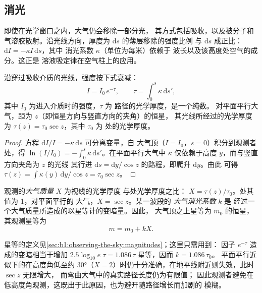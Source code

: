 \subsection*{消光}

即使在光学窗口之内，大气仍会移除一部分光，
其方式包括吸收，以及被分子和气溶胶散射。沿光线方向，厚度为
$\mathrm ds$ 的薄层移除的强度比例
与 $\mathrm ds$ 成正比：$\mathrm dI = -\kappa I\,\mathrm ds$，其中
消光系数 $\kappa$（单位为每米）依赖于
波长以及该高度处空气的成分。这正是
溶液吸定律在空气柱上的应用。

\begin{proposition}[布格定律]\label{prop:b1:observing-the-sky:bouguer}
沿穿过吸收介质的光线，强度按下式衰减：
\[
  I = I_0\,e^{-\tau}, \qquad \tau = \int_0^s \kappa\,\mathrm ds' ,
\]
其中 $I_0$ 为进入介质时的强度，$\tau$ 为
路径的光学厚度，是一个纯数。
对平面平行大气，距为 $z$（即恒星方向与竖直方向的夹角）的恒星，
其光线所经过的光学厚度为
$\tau(z) = \tau_0\sec z$，其中 $\tau_0$ 为
处的光学厚度。
\end{proposition}

\begin{proof}
方程 $\mathrm dI/I = -\kappa\,\mathrm ds$ 可分离变量，自
大气顶（$I = I_0$，$s = 0$）积分到观测者处，得
$\ln(I/I_0) = -\int_0^s\kappa\,\mathrm ds'$。在平面平行大气中
$\kappa$ 仅依赖于高度 $y$，而与竖直方向夹角为 $z$ 的光线
其行进 $\mathrm ds = \mathrm dy/\cos z$ 的路程，即爬升 $\mathrm dy$。由此
可得 $\tau(z) = \int \kappa(y)\,\mathrm dy/\cos z = \tau_0\sec z$。
\end{proof}

\begin{definition}\label{def:b1:observing-the-sky:extinction}
观测的\emph{大气质量} $X$ 为视线的光学厚度
与处光学厚度之比：
$X = \tau(z)/\tau_0$。处其值为 1，对平面平行的
大气，$X = \sec z$。某一波段的
\emph{大气消光系数} $k$ 是
经过一个大气质量所造成的以星等计的变暗量。因此，
大气顶之上星等为 $m_0$ 的恒星，其观测星等为
\[
  m = m_0 + kX .
\]
\end{definition}

星等的定义见\cref{sec:b1:observing-the-sky:magnitudes}；这里只需用到：
因子 $e^{-\tau}$ 造成的变暗相当于增加
$2.5\log_{10}e\;\tau = 1.086\,\tau$ 星等，因而 $k = 1.086\,\tau_0$。
平面平行近似下的在高度角低至约
\ang{30}（$X = 2$）时仍十分准确，在地平线附近则失效，此时 $\sec z$ 无限增大，
而弯曲大气中的真实路径长度仍为有限值；
因此观测者避免在低高度角观测，这既出于此原因，也为避开随路径增长而加剧的
模糊。

